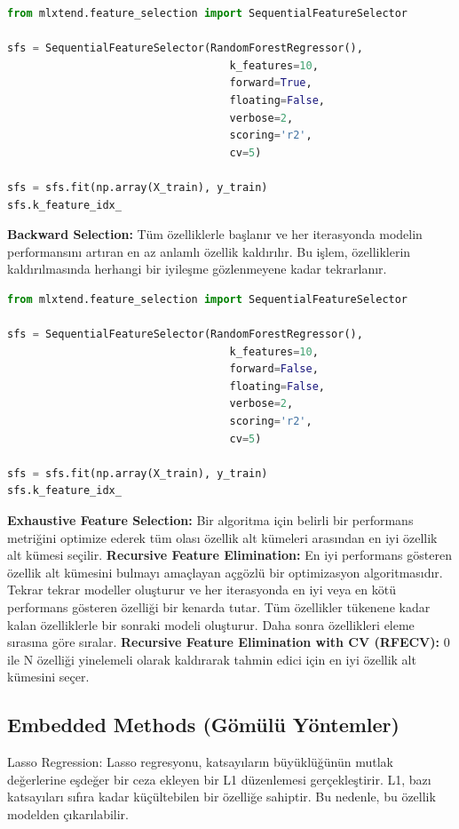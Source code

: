 \begin{lstlisting}[language=Python]
from mlxtend.feature_selection import SequentialFeatureSelector

sfs = SequentialFeatureSelector(RandomForestRegressor(), 
								   k_features=10, 
								   forward=True, 
								   floating=False, 
								   verbose=2,
								   scoring='r2',
								   cv=5)

sfs = sfs.fit(np.array(X_train), y_train)
sfs.k_feature_idx_
\end{lstlisting}

\textbf{Backward Selection:} Tüm özelliklerle başlanır ve her iterasyonda modelin performansını artıran en az anlamlı özellik kaldırılır. Bu işlem, özelliklerin kaldırılmasında herhangi bir iyileşme gözlenmeyene kadar tekrarlanır.

\begin{lstlisting}[language=Python]
from mlxtend.feature_selection import SequentialFeatureSelector

sfs = SequentialFeatureSelector(RandomForestRegressor(), 
								   k_features=10, 
								   forward=False, 
								   floating=False, 
								   verbose=2,
								   scoring='r2',
								   cv=5)

sfs = sfs.fit(np.array(X_train), y_train)
sfs.k_feature_idx_
\end{lstlisting}

\textbf{Exhaustive Feature Selection:} Bir algoritma için belirli bir performans metriğini optimize ederek tüm olası özellik alt kümeleri arasından en iyi özellik alt kümesi seçilir.\newline
\textbf{Recursive Feature Elimination:} En iyi performans gösteren özellik alt kümesini bulmayı amaçlayan açgözlü bir optimizasyon algoritmasıdır. Tekrar tekrar modeller oluşturur ve her iterasyonda en iyi veya en kötü performans gösteren özelliği bir kenarda tutar. Tüm özellikler tükenene kadar kalan özelliklerle bir sonraki modeli oluşturur. Daha sonra özellikleri eleme sırasına göre sıralar.\newline
\textbf{Recursive Feature Elimination with CV (RFECV):} 0 ile N özelliği yinelemeli olarak kaldırarak tahmin edici için en iyi özellik alt kümesini seçer.

\subsection{Embedded Methods (Gömülü Yöntemler)}
Lasso Regression: Lasso regresyonu, katsayıların büyüklüğünün mutlak değerlerine eşdeğer bir ceza ekleyen bir L1 düzenlemesi gerçekleştirir. L1, bazı katsayıları sıfıra kadar küçültebilen bir özelliğe sahiptir. Bu nedenle, bu özellik modelden çıkarılabilir.

